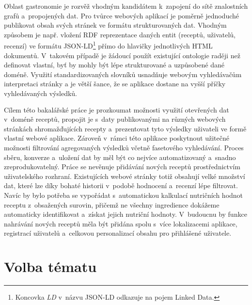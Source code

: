 Oblast gastronomie je rozvěž vhodným kandidátem k~zapojení do sítě znalostních grafů a~propojených dat. Pro tvůrce webových aplikací je poměrně jednoduché publikovat obsah svých stránek ve formátu strukturovaných dat. Vhodným způsobem je např. vložení RDF reprezentace daných entit (receptů, uživatelů, recenzí) ve formátu JSON-LD\footnote{Koncovka \emph{LD} v~názvu JSON-LD odkazuje na pojem Linked Data.} přímo do hlavičky jednotlivých HTML dokumentů. V~takovém případě je žádoucí použít existující ontologie raději než definovat vlastní, byť by mohly být lépe strukturované a uzpůsobené dané doméně. Využití standardizovaných slovníků usnadňuje webovým vyhledávačům interpretaci stránky a je větší šance, že se aplikace dostane na vyšší příčky vyhledávaných výsledků.

Cílem této bakalářské práce je prozkoumat možnosti využití otevřených dat v~doméně receptů, propojit je s~daty publikovanými na různých webových stránkách shromažďujících recepty a~prezentovat tyto výsledky uživateli ve formě vlastní webové aplikace. Zároveň v~rámci této aplikace poskytnout užitečné možnosti filtrování agregovaných výsledků včetně fasetového vyhledávání. Proces sbě\-ru, konverze a~uložení dat by měl být co nejvíce automatizovaný a~snadno zreprodukovatelný. Práce se nevěnuje přidávání nových receptů prostřednictvím uživatelského rozhraní. Existujících webové stránky totiž obsahují velké množství dat, které lze díky bohaté historii v~podobě hodnocení a~recenzí lépe filtrovat. Navíc by bylo potřeba se vypořádat s~automatickou kalkulací nutričních hodnot receptu z~obsažených surovin, přičemž ne všechny ingredience dokážeme automaticky identifikovat a~získat jejich nutriční hodnoty. V~budoucnu by funkce nahrávání nových receptů měla být přidána spolu s~více lokalizacemi aplikace, registrací uživatelů a~celkovou personalizací obsahu pro přihlášené uživatele.

\section*{Volba tématu}
\setcounter{tocdepth}{1}

